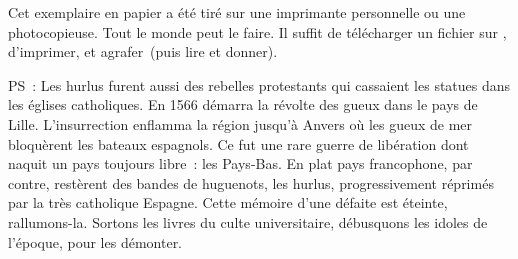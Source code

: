 \documentclass[twoside]{book} %
\begin{document}
Cet exemplaire en papier a été tiré sur une imprimante personnelle
  ou une photocopieuse. Tout le monde peut le faire.
Il suffit de
télécharger un fichier sur \href{https://hurlus.fr}{},
d’imprimer, et agrafer (puis lire et donner).\par

\bigskip

\noindent PS : Les hurlus furent aussi des rebelles protestants qui cassaient les statues dans les églises catholiques. En 1566 démarra la révolte des gueux dans le pays de Lille. L’insurrection enflamma la région jusqu’à Anvers où les gueux de mer bloquèrent les bateaux espagnols.
Ce fut une rare guerre de libération dont naquit un pays toujours libre : les Pays-Bas.
En plat pays francophone, par contre, restèrent des bandes de huguenots, les hurlus, progressivement réprimés par la très catholique Espagne.
Cette mémoire d’une défaite est éteinte, rallumons-la. Sortons les livres du culte universitaire, débusquons les idoles de l’époque, pour les démonter.
\end{document}
